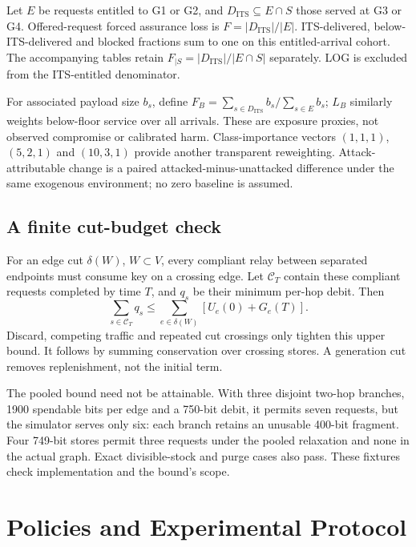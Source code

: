 \documentclass[conference,a4paper]{IEEEtran}
\begin{document}
Let $E$ be requests entitled to G1 or G2, and $D_{\mathrm{ITS}}\subseteq E\cap S$ those served at G3 or G4. Offered-request forced assurance loss is $F=|D_{\mathrm{ITS}}|/|E|$. ITS-delivered, below-ITS-delivered and blocked fractions sum to one on this entitled-arrival cohort. The accompanying tables retain $F_{\mid S}=|D_{\mathrm{ITS}}|/|E\cap S|$ separately. LOG is excluded from the ITS-entitled denominator.

For associated payload size $b_s$, define $F_B=\sum_{s\in D_{\mathrm{ITS}}}b_s/\sum_{s\in E}b_s$; $L_B$ similarly weights below-floor service over all arrivals. These are exposure proxies, not observed compromise or calibrated harm. Class-importance vectors $(1,1,1)$, $(5,2,1)$ and $(10,3,1)$ provide another transparent reweighting. Attack-attributable change is a paired attacked-minus-unattacked difference under the same exogenous environment; no zero baseline is assumed.

\subsection{A finite cut-budget check}\label{sec:bound}
For an edge cut $\delta(W)$, $W\subset V$, every compliant relay between separated endpoints must consume key on a crossing edge. Let $\mathcal C_T$ contain these compliant requests completed by time $T$, and $q_s$ be their minimum per-hop debit. Then
\begin{equation}\label{eq:cut}
\sum_{s\in\mathcal C_T}q_s
\leq\sum_{e\in\delta(W)}\left[U_e(0)+G_e(T)\right].
\end{equation}
Discard, competing traffic and repeated cut crossings only tighten this upper bound. It follows by summing conservation over crossing stores. A generation cut removes replenishment, not the initial term.

The pooled bound need not be attainable. With three disjoint two-hop branches, 1900 spendable bits per edge and a 750-bit debit, it permits seven requests, but the simulator serves only six: each branch retains an unusable 400-bit fragment. Four 749-bit stores permit three requests under the pooled relaxation and none in the actual graph. Exact divisible-stock and purge cases also pass. These fixtures check implementation and the bound's scope.

\section{Policies and Experimental Protocol}\label{sec:protocol}
\end{document}
